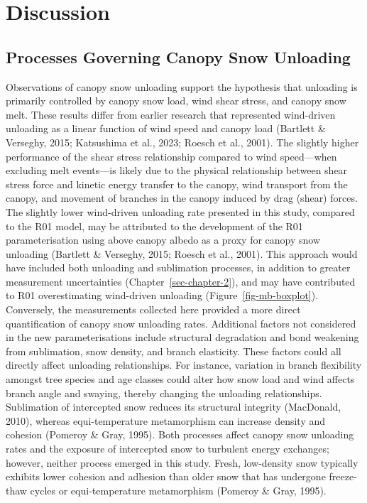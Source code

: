 \documentclass[
  letterpaper,
]{tex/uofsthesis-cs}
\begin{document}
\section{Discussion}\label{discussion-2}

\subsection{Processes Governing Canopy Snow
Unloading}\label{processes-governing-canopy-snow-unloading}

Observations of canopy snow unloading support the hypothesis that
unloading is primarily controlled by canopy snow load, wind shear
stress, and canopy snow melt. These results differ from earlier research
that represented wind-driven unloading as a linear function of wind
speed and canopy load (Bartlett \& Verseghy, 2015; Katsushima et al.,
2023; Roesch et al., 2001). The slightly higher performance of the shear
stress relationship compared to wind speed---when excluding melt
events---is likely due to the physical relationship between shear stress
force and kinetic energy transfer to the canopy, wind transport from the
canopy, and movement of branches in the canopy induced by drag (shear)
forces. The slightly lower wind-driven unloading rate presented in this
study, compared to the R01 model, may be attributed to the development
of the R01 parameterisation using above canopy albedo as a proxy for
canopy snow unloading (Bartlett \& Verseghy, 2015; Roesch et al., 2001).
This approach would have included both unloading and sublimation
processes, in addition to greater measurement uncertainties
(Chapter~\ref{sec-chapter-2}), and may have contributed to R01
overestimating wind-driven unloading (Figure~\ref{fig-mb-boxplot}).
Conversely, the measurements collected here provided a more direct
quantification of canopy snow unloading rates. Additional factors not
considered in the new parameterisations include structural degradation
and bond weakening from sublimation, snow density, and branch
elasticity. These factors could all directly affect unloading
relationships. For instance, variation in branch flexibility amongst
tree species and age classes could alter how snow load and wind affects
branch angle and swaying, thereby changing the unloading relationships.
Sublimation of intercepted snow reduces its structural integrity
(MacDonald, 2010), whereas equi-temperature metamorphism can increase
density and cohesion (Pomeroy \& Gray, 1995). Both processes affect
canopy snow unloading rates and the exposure of intercepted snow to
turbulent energy exchanges; however, neither process emerged in this
study. Fresh, low-density snow typically exhibits lower cohesion and
adhesion than older snow that has undergone freeze-thaw cycles or
equi-temperature metamorphism (Pomeroy \& Gray, 1995).
\end{document}
